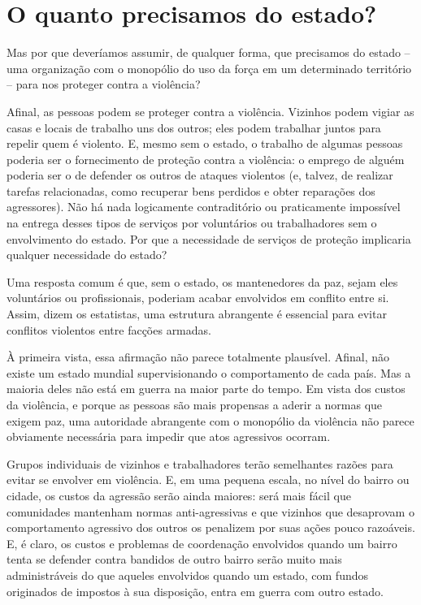 \section{O quanto precisamos do estado?}

Mas por que deveríamos assumir, de qualquer forma, que precisamos do estado -- uma organização com o monopólio do uso da força em um determinado território -- para nos proteger contra a violência? 

Afinal, as pessoas podem se proteger contra a violência. Vizinhos podem vigiar as casas e locais de trabalho uns dos outros; eles podem trabalhar juntos para repelir quem é violento. E, mesmo sem o estado, o trabalho de algumas pessoas poderia ser o fornecimento de proteção contra a violência: o emprego de alguém poderia ser o de defender os outros de ataques violentos (e, talvez, de realizar tarefas relacionadas, como recuperar bens perdidos e obter reparações dos agressores). Não há nada logicamente contraditório ou praticamente impossível na entrega desses tipos de serviços por voluntários ou trabalhadores sem o envolvimento do estado. Por que a necessidade de serviços de proteção implicaria qualquer necessidade do estado?

Uma resposta comum é que, sem o estado, os mantenedores da paz, sejam eles voluntários ou profissionais, poderiam acabar envolvidos em conflito entre si. Assim, dizem os estatistas, uma estrutura abrangente é essencial para evitar conflitos violentos entre facções armadas.

À primeira vista, essa afirmação não parece totalmente plausível. Afinal, não existe um estado mundial supervisionando o comportamento de cada país. Mas a maioria deles não está em guerra na maior parte do tempo. Em vista dos custos da violência, e porque as pessoas são mais propensas a aderir a normas que exigem paz, uma autoridade abrangente com o monopólio da violência não parece obviamente necessária para impedir que atos agressivos ocorram.

Grupos individuais de vizinhos e trabalhadores terão semelhantes razões para evitar se envolver em violência. E, em uma pequena escala, no nível do bairro ou cidade, os custos da agressão serão ainda maiores: será mais fácil que comunidades mantenham normas anti-agressivas e que vizinhos que desaprovam o comportamento agressivo dos outros os penalizem por suas ações pouco razoáveis. E, é claro, os custos e problemas de coordenação envolvidos quando um bairro tenta se defender contra bandidos de outro bairro serão muito mais administráveis do que aqueles envolvidos quando um estado, com fundos originados de impostos à sua disposição, entra em guerra com outro estado.

